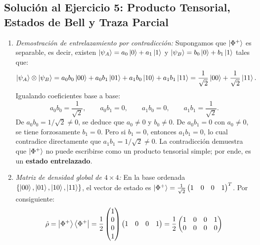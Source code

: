 \begin{appendices}
\subsection[Solución 5: Estados de Bell y traza parcial]{Solución al Ejercicio 5: Producto Tensorial, Estados de Bell y Traza Parcial}
\begin{enumerate}
    \item \textit{Demostración de entrelazamiento por contradicción:}
    Supongamos que $\left| \Phi^+ \right\rangle$ es separable, es decir, existen $\left| \psi_A \right\rangle = a_0\left| 0 \right\rangle + a_1\left| 1 \right\rangle$ y $\left| \psi_B \right\rangle = b_0\left| 0 \right\rangle + b_1\left| 1 \right\rangle$ tales que:
    \begin{equation}
        \left| \psi_A \right\rangle \otimes \left| \psi_B \right\rangle = a_0 b_0\left| 00 \right\rangle + a_0 b_1\left| 01 \right\rangle + a_1 b_0\left| 10 \right\rangle + a_1 b_1\left| 11 \right\rangle = \frac{1}{\sqrt{2}}\left| 00 \right\rangle + \frac{1}{\sqrt{2}}\left| 11 \right\rangle.
    \end{equation}
    Igualando coeficientes base a base:
    \begin{equation}
        a_0 b_0 = \frac{1}{\sqrt{2}}, \qquad a_0 b_1 = 0, \qquad a_1 b_0 = 0, \qquad a_1 b_1 = \frac{1}{\sqrt{2}}.
    \end{equation}
    De $a_0 b_0 = 1/\sqrt{2} \neq 0$, se deduce que $a_0 \neq 0$ y $b_0 \neq 0$. De $a_0 b_1 = 0$ con $a_0 \neq 0$, se tiene forzosamente $b_1 = 0$. Pero si $b_1 = 0$, entonces $a_1 b_1 = 0$, lo cual contradice directamente que $a_1 b_1 = 1/\sqrt{2} \neq 0$. La contradicción demuestra que $\left| \Phi^+ \right\rangle$ no puede escribirse como un producto tensorial simple; por ende, es un \textbf{estado entrelazado}.
    \item \textit{Matriz de densidad global de $4\times 4$:}
    En la base ordenada $\{\left| 00 \right\rangle, \left| 01 \right\rangle, \left| 10 \right\rangle, \left| 11 \right\rangle\}$, el vector de estado es $\left| \Phi^+ \right\rangle = \frac{1}{\sqrt{2}}\begin{pmatrix} 1 & 0 & 0 & 1 \end{pmatrix}^T$. Por consiguiente:
    \begin{equation}
        \hat{\rho} = \left| \Phi^+ \right\rangle\left\langle \Phi^+ \right| = \frac{1}{2}\begin{pmatrix} 1 \\ 0 \\ 0 \\ 1 \end{pmatrix}\begin{pmatrix} 1 & 0 & 0 & 1 \end{pmatrix} = \frac{1}{2}\begin{pmatrix}
            1 & 0 & 0 & 1 \\
            0 & 0 & 0 & 0 \\

\end{pmatrix}
\end{equation}
\end{enumerate}
\end{appendices}

